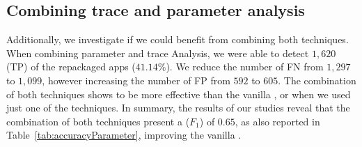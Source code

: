 \begin{table}[ht]
  \caption{Accuracy of the \mas with aid of complementary techniques (3,211 app pairs).}
  \label{tab:accuracyParameter}
\end{table}

\subsection{Combining trace and parameter analysis}

Additionally, we investigate if we could benefit from combining both techniques. When combining parameter and trace Analysis, we were able to detect $1,620$ (TP) of the repackaged apps ($41.14$\%). We reduce the number of FN from $1,297$ to $1,099$, however increasing the number of FP from $592$ to $605$. The combination of both techniques shows to be more effective than the vanilla \mas, or when we used just one of the techniques. In summary, the results of our studies reveal that the combination of both techniques present a ($F_1$) of $0.65$, as also reported in Table~\ref{tab:accuracyParameter}, improving the vanilla \mas.

